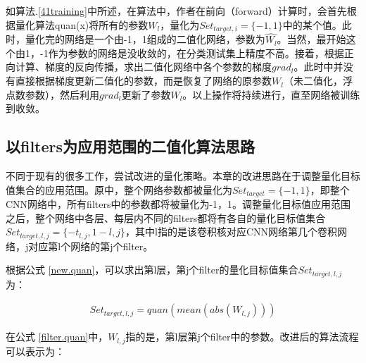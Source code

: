\documentclass[ pdftex, oneside, master]{NJUthesis}
\begin{document}
如算法.\ref{41training}中所述，在\cite{binary}算法中，作者在前向（forward）计算时，会首先根据量化算法quan(x)将所有的参数$W_l$，量化为$Set_ {target,i} = \{-1,1\}$中的某个值。此时，量化完的网络是一个由-1，1组成的二值化网络，参数为$\hat{W_l}$。当然，最开始这个由1，-1作为参数的网络是没收敛的，在分类测试集上精度不高。接着，根据正向计算、梯度的反向传播，求出二值化网络中各个参数的梯度$grad_l$。此时\cite{binary}中并没有直接根据梯度更新二值化的参数，而是恢复了网络的原参数$W_l$（未二值化，浮点数参数），然后利用$grad_l$更新了参数$W_l$。以上操作将持续进行，直至网络被训练到收敛。

\subsection{以filters为应用范围的二值化算法思路}

不同于现有的很多工作，尝试改进\cite{binary}的量化策略。本章的改进思路在于调整量化目标值集合的应用范围。原\cite{binary}中，整个网络参数都被量化为$Set_ {target} = \{-1,1\}$，即整个CNN网络中，所有filters中的参数都将被量化为-1，1。调整量化目标值应用范围之后，整个网络中各层、每层内不同的filters都将有各自的量化目标值集合$Set_ {target,l,j} = \{-t_{l,j},1-{l,j}\}$，其中l指的是该卷积核对应CNN网络第几个卷积网络，j对应第l个网络的第j个filter。

根据公式 \ref{new.quan}，可以求出第l层，第j个filter的量化目标值集合$Set_ {target,l,j}$为：

\begin{eqnarray}
Set_ {target,l,j} = quan(mean(abs(W_{l,j})))
\label{filter.quan}
\end{eqnarray}

在公式 \ref{filter.quan}中，$W_{l,j}$指的是，第l层第j个filter中的参数。改进后的算法流程可以表示为：
\end{document}
